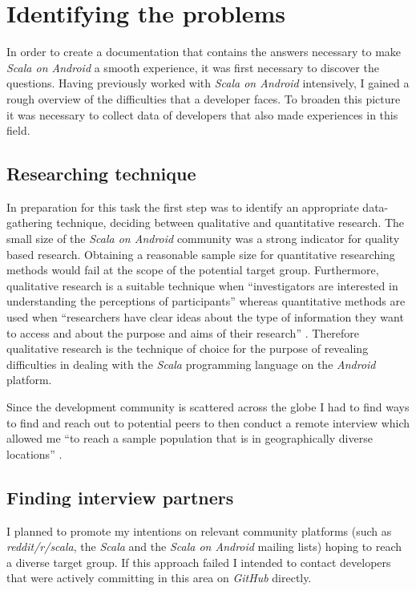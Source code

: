 \section{Identifying the problems}

In order to create a documentation that contains the answers necessary to make \textit{Scala on Android} a smooth experience, it was first necessary to discover the questions. Having previously worked with \textit{Scala on Android} intensively, I gained a rough overview of the difficulties that a developer faces. To broaden this picture it was necessary to collect data of developers that also made experiences in this field.

\subsection{Researching technique}

In preparation for this task the first step was to identify an appropriate data-gathering technique, deciding between qualitative and quantitative research. The small size of the \textit{Scala on Android} community was a strong indicator for quality based research. Obtaining a reasonable sample size for quantitative researching methods would fail at the scope of the potential target group. Furthermore, qualitative research is a suitable technique when \enquote{investigators are interested in understanding the perceptions of participants} \cite[p. 72]{berg01} whereas quantitative methods are used when \enquote{researchers have clear ideas about the type of information they want to access and about the purpose and aims of their research} \cite[p. 72]{berg01}. Therefore qualitative research is the technique of choice for the purpose of revealing difficulties in dealing with the \textit{Scala} programming language on the \textit{Android} platform.

Since the development community is scattered across the globe I had to find ways to find and reach out to potential peers to then conduct a remote interview which allowed me \enquote{to reach a sample population that is in geographically diverse locations} \cite[p. 82]{berg01}.

\subsection{Finding interview partners}

I planned to promote my intentions on relevant community platforms (such as \textit{reddit/r/scala}, the \textit{Scala} and the \textit{Scala on Android} mailing lists) hoping to reach a diverse target group. If this approach failed I intended to contact developers that were actively committing in this area on \textit{GitHub} directly.

